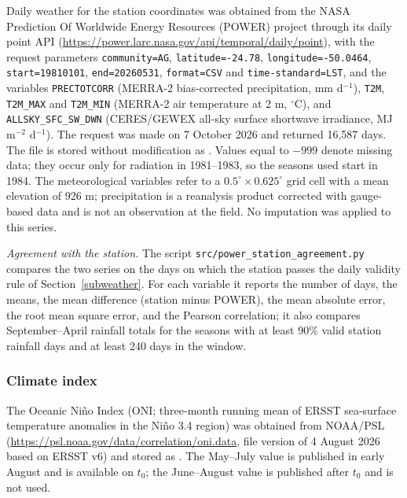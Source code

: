\documentclass[times,final,authoryear]{elsarticle}
\begin{document}
Daily weather for the station coordinates was obtained from the NASA Prediction Of Worldwide Energy Resources (POWER) project through its daily point API (\url{https://power.larc.nasa.gov/api/temporal/daily/point}), with the request parameters \texttt{community=AG}, \texttt{latitude=-24.78}, \texttt{longitude=-50.0464}, \texttt{start=19810101}, \texttt{end=20260531}, \texttt{format=CSV} and \texttt{time-standard=LST}, and the variables \texttt{PRECTOTCORR} (MERRA-2 bias-corrected precipitation, mm d$^{-1}$), \texttt{T2M}, \texttt{T2M\_MAX} and \texttt{T2M\_MIN} (MERRA-2 air temperature at 2 m, $^{\circ}$C), and \texttt{ALLSKY\_SFC\_SW\_DWN} (CERES/GEWEX all-sky surface shortwave irradiance, MJ m$^{-2}$ d$^{-1}$). The request was made on 7 October 2026 and returned 16,587 days. The file is stored without modification as . Values equal to $-999$ denote missing data; they occur only for radiation in 1981--1983, so the seasons used start in 1984. The meteorological variables refer to a $0.5^{\circ} \times 0.625^{\circ}$ grid cell with a mean elevation of 926 m; precipitation is a reanalysis product corrected with gauge-based data and is not an observation at the field. No imputation was applied to this series.

\emph{Agreement with the station.} The script \texttt{src/power\_station\_agreement.py} compares the two series on the days on which the station passes the daily validity rule of Section~\ref{subweather}. For each variable it reports the number of days, the means, the mean difference (station minus POWER), the mean absolute error, the root mean square error, and the Pearson correlation; it also compares September--April rainfall totals for the seasons with at least 90\% valid station rainfall days and at least 240 days in the window.

\subsubsection{Climate index}
\label{suboni}

The Oceanic Ni\~no Index (ONI; three-month running mean of ERSST sea-surface temperature anomalies in the Ni\~no 3.4 region) was obtained from NOAA/PSL (\url{https://psl.noaa.gov/data/correlation/oni.data}, file version of 4 August 2026 based on ERSST v6) and stored as . The May--July value is published in early August and is available on $t_0$; the June--August value is published after $t_0$ and is not used.
\end{document}
